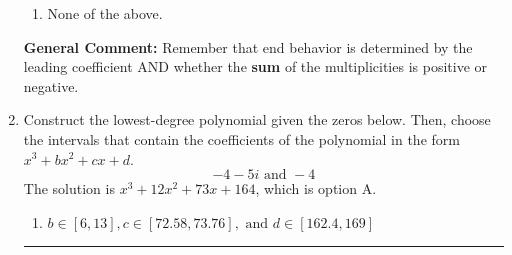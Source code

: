 \documentclass{extbook}[14pt]
\newcommand{\litem}[1]{\item #1

\rule{\textwidth}{0.4pt}}
\begin{document}
\begin{enumerate}
{\begin{center}
\end{center}\begin{enumerate}[label=\Alph*.]
\item None of the above.\end{enumerate}
\textbf{General Comment:} Remember that end behavior is determined by the leading coefficient AND whether the \textbf{sum} of the multiplicities is positive or negative.
}
\litem{
Construct the lowest-degree polynomial given the zeros below. Then, choose the intervals that contain the coefficients of the polynomial in the form $x^3+bx^2+cx+d$.
\[ -4 - 5 i \text{ and } -4 \]The solution is \( x^{3} +12 x^{2} +73 x + 164 \), which is option A.\begin{enumerate}[label=\Alph*.]
\item \( b \in [6, 13], c \in [72.58, 73.76], \text{ and } d \in [162.4, 169] \)


\end{enumerate}}
\end{enumerate}
\end{document}
